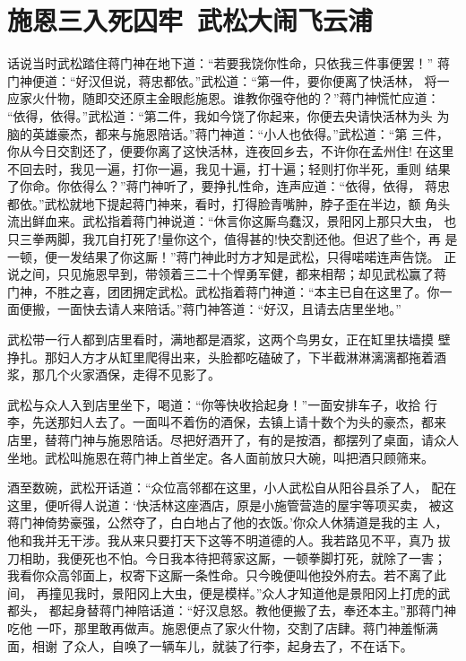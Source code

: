 \chapter{施恩三入死囚牢~武松大闹飞云浦}

话说当时武松踏住蒋门神在地下道：“若要我饶你性命，只依我三件事便罢！”
蒋门神便道：“好汉但说，蒋忠都依。”武松道：“第一件，要你便离了快活林，
将一应家火什物，随即交还原主金眼彪施恩。谁教你强夺他的？”蒋门神慌忙应道：
“依得，依得。”武松道：“第二件，我如今饶了你起来，你便去央请快活林为头
为脑的英雄豪杰，都来与施恩陪话。”蒋门神道：“小人也依得。”武松道：“第
三件，你从今日交割还了，便要你离了这快活林，连夜回乡去，不许你在孟州住!
在这里不回去时，我见一遍，打你一遍，我见十遍，打十遍；轻则打你半死，重则
结果了你命。你依得么？”蒋门神听了，要挣扎性命，连声应道：“依得，依得，
蒋忠都依。”武松就地下提起蒋门神来，看时，打得脸青嘴肿，脖子歪在半边，额
角头流出鲜血来。武松指着蒋门神说道：“休言你这厮鸟蠢汉，景阳冈上那只大虫，
也只三拳两脚，我兀自打死了!量你这个，值得甚的!快交割还他。但迟了些个，再
是一顿，便一发结果了你这厮！”蒋门神此时方才知是武松，只得喏喏连声告饶。
正说之间，只见施恩早到，带领着三二十个悍勇军健，都来相帮；却见武松赢了蒋
门神，不胜之喜，团团拥定武松。武松指着蒋门神道：“本主已自在这里了。你一
面便搬，一面快去请人来陪话。”蒋门神答道：“好汉，且请去店里坐地。”

武松带一行人都到店里看时，满地都是酒浆，这两个鸟男女，正在缸里扶墙摸
壁挣扎。那妇人方才从缸里爬得出来，头脸都吃磕破了，下半截淋淋漓漓都拖着酒
浆，那几个火家酒保，走得不见影了。

武松与众人入到店里坐下，喝道：“你等快收拾起身！”一面安排车子，收拾
行李，先送那妇人去了。一面叫不着伤的酒保，去镇上请十数个为头的豪杰，都来
店里，替蒋门神与施恩陪话。尽把好酒开了，有的是按酒，都摆列了桌面，请众人
坐地。武松叫施恩在蒋门神上首坐定。各人面前放只大碗，叫把酒只顾筛来。

酒至数碗，武松开话道：“众位高邻都在这里，小人武松自从阳谷县杀了人，
配在这里，便听得人说道：‘快活林这座酒店，原是小施管营造的屋宇等项买卖，
被这蒋门神倚势豪强，公然夺了，白白地占了他的衣饭。’你众人休猜道是我的主
人，他和我并无干涉。我从来只要打天下这等不明道德的人。我若路见不平，真乃
拔刀相助，我便死也不怕。今日我本待把蒋家这厮，一顿拳脚打死，就除了一害；
我看你众高邻面上，权寄下这厮一条性命。只今晚便叫他投外府去。若不离了此间，
再撞见我时，景阳冈上大虫，便是模样。”众人才知道他是景阳冈上打虎的武都头，
都起身替蒋门神陪话道：“好汉息怒。教他便搬了去，奉还本主。”那蒋门神吃他
一吓，那里敢再做声。施恩便点了家火什物，交割了店肆。蒋门神羞惭满面，相谢
了众人，自唤了一辆车儿，就装了行李，起身去了，不在话下。

